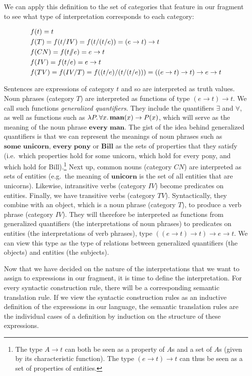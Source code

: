 We can apply this definition to the set of categories that feature in our
fragment to see what type of interpretation corresponds to each category:

\begin{align*}
  &f(t) = t \\
  &f(T) = f(t / IV) = f(t / (t / e)) =  (e \to t) \to t \\
  &f(CN) = f(t /\!\!/ e) = e \to t \\
  &f(IV) = f(t / e) = e \to t \\
  &f(TV) = f(IV / T) = f ((t / e) / (t / (t / e))) = ((e \to t) \to t) \to e \to t
\end{align*}

Sentences are expressions of category $t$ and so are interpreted as
truth values. Noun phrases (category $T$) are interpreted as functions of
type $(e \to t) \to t$. We call such functions \emph{generalized
  quantifiers}. They include the quantifiers $\exists$ and $\forall$, as
well as functions such as $\lambda P.\, \forall x.\, \textbf{man}(x) \to P(x)$,
which will serve as the meaning of the noun phrase $\textbf{every
  man}$. The gist of the idea behind generalized quantifiers is that we can
represent the meanings of noun phrases such as $\textbf{some unicorn}$,
$\textbf{every pony}$ or $\textbf{Bill}$ as the sets of properties that
they satisfy (i.e.\ which properties hold for some unicorn, which hold for
every pony, and which hold for Bill).\footnote{The type $A \to t$ can both
  be seen as a property of $A$s and a set of $A$s (given by its
  characteristic function). The type $(e \to t) \to t$ can thus be seen as
  a set of properties of entities.} Next up, common nouns (category $CN$)
are interpreted as sets of entities (e.g.\ the meaning of
$\textbf{unicorn}$ is the set of all entities that are unicorns). Likewise,
intransitive verbs (category $IV$) become predicates on entities. Finally,
we have transitive verbs (category $TV$). Syntactically, they combine with
an object, which is a noun phrase (category $T$), to produce a verb phrase
(category $IV$). They will therefore be interpreted as functions from
generalized quantifiers (the interpretations of noun phrases) to predicates
on entities (the interpretations of verb phrases), type
$((e \to t) \to t) \to e \to t$. We can view this type as the type of
relations between generalized quantifiers (the objects) and entities (the
subjects).

Now that we have decided on the nature of the interpretations that we want
to assign to expressions in our fragment, it is time to define the
interpretation. For every syntactic construction rule, there will be a
corresponding semantic translation rule. If we view the syntactic
construction rules as an inductive definition of the expressions in our
language, the semantic translation rules are the individual cases of a
definition by induction on the structure of these expressions.

